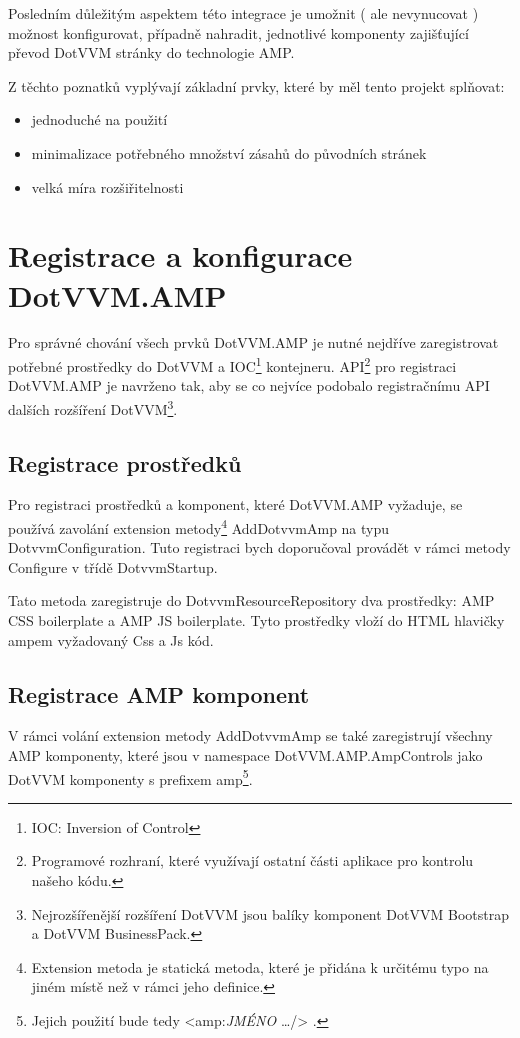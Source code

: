 Posledním důležitým aspektem této integrace je umožnit ( ale nevynucovat ) možnost konfigurovat, případně nahradit, jednotlivé komponenty zajišťující převod DotVVM stránky do technologie AMP.

Z těchto poznatků vyplývají základní prvky, které by měl tento projekt splňovat:

\begin{itemize}
\item jednoduché na použití
\item minimalizace potřebného množství zásahů do původních stránek
\item velká míra rozšiřitelnosti
\end{itemize}
\section{Registrace a konfigurace DotVVM.AMP}
Pro správné chování všech prvků DotVVM.AMP je nutné nejdříve zaregistrovat potřebné prostředky do DotVVM a IOC\footnote{IOC: Inversion of Control} kontejneru. API\footnote{Programové rozhraní, které využívají ostatní části aplikace pro kontrolu našeho kódu.} pro registraci DotVVM.AMP je navrženo tak, aby se co nejvíce podobalo registračnímu API dalších rozšíření DotVVM\footnote{Nejrozšířenější rozšíření DotVVM jsou balíky komponent DotVVM Bootstrap a DotVVM BusinessPack.}.

\subsection*{Registrace prostředků}
Pro registraci prostředků a komponent, které DotVVM.AMP vyžaduje, se používá zavolání extension metody\footnote{\label{extension}Extension metoda je statická metoda, které je přidána k určitému typo na jiném místě než v rámci jeho definice.} AddDotvvmAmp na typu DotvvmConfiguration. Tuto registraci bych doporučoval provádět v rámci metody Configure v třídě DotvvmStartup.

Tato metoda zaregistruje do DotvvmResourceRepository dva prostředky: AMP CSS boilerplate a AMP JS boilerplate. Tyto prostředky vloží do HTML hlavičky ampem vyžadovaný Css a Js kód.

\subsection*{Registrace AMP komponent}
V rámci volání extension metody AddDotvvmAmp se také zaregistrují všechny AMP komponenty, které jsou v namespace DotVVM.AMP.AmpControls jako DotVVM komponenty s prefixem amp\footnote{Jejich použití bude tedy <amp:\textit{JMÉNO} \ldots /> . }.

